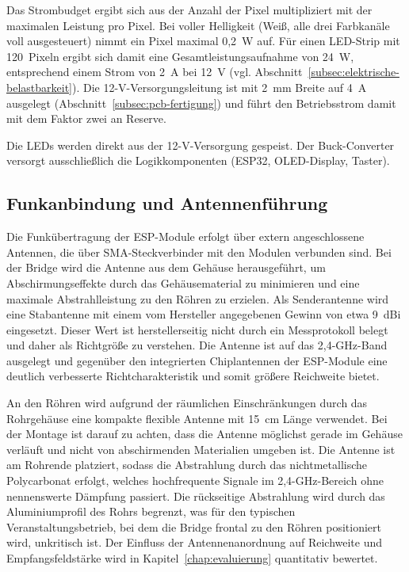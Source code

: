 Das Strombudget ergibt sich aus der Anzahl der Pixel
multipliziert mit der maximalen Leistung pro Pixel. Bei voller
Helligkeit (Weiß, alle drei Farbkanäle voll ausgesteuert)
nimmt ein Pixel maximal 0,2~W auf. Für einen
LED-Strip mit 120~Pixeln ergibt sich damit eine
Gesamtleistungsaufnahme von 24~W, entsprechend einem Strom
von 2~A bei 12~V (vgl. Abschnitt~\ref{subsec:elektrische-belastbarkeit}).
Die 12-V-Versorgungsleitung ist mit 2~mm Breite auf 4~A ausgelegt
(Abschnitt~\ref{subsec:pcb-fertigung}) und führt den Betriebsstrom damit
mit dem Faktor zwei an Reserve.

Die LEDs werden direkt aus der 12-V-Versorgung gespeist. Der
Buck-Converter versorgt ausschließlich die Logikkomponenten
(ESP32, OLED-Display, Taster).

\subsection{Funkanbindung und Antennenführung}
\label{subsec:funk-antenne}

Die Funkübertragung der ESP-Module erfolgt über extern
angeschlossene Antennen, die über SMA-Steckverbinder mit den
Modulen verbunden sind. Bei der Bridge wird die Antenne aus
dem Gehäuse herausgeführt, um Abschirmungseffekte durch das
Gehäusematerial zu minimieren und eine maximale
Abstrahlleistung zu den Röhren zu erzielen. Als
Senderantenne wird eine Stabantenne mit einem vom Hersteller
angegebenen Gewinn von etwa 9~dBi eingesetzt. Dieser Wert ist
herstellerseitig nicht durch ein Messprotokoll belegt und daher als
Richtgröße zu verstehen. Die Antenne ist auf das
2,4-GHz-Band ausgelegt und
gegenüber den integrierten Chiplantennen der ESP-Module eine
deutlich verbesserte Richtcharakteristik und somit größere
Reichweite bietet.

An den Röhren wird aufgrund der räumlichen Einschränkungen
durch das Rohrgehäuse eine kompakte flexible Antenne mit
15~cm Länge verwendet. Bei der Montage ist darauf zu achten,
dass die Antenne möglichst gerade im Gehäuse verläuft und
nicht von abschirmenden Materialien umgeben ist. Die Antenne
ist am Rohrende platziert, sodass die Abstrahlung durch das
nichtmetallische Polycarbonat erfolgt, welches hochfrequente
Signale im 2,4-GHz-Bereich ohne nennenswerte Dämpfung
passiert. Die rückseitige Abstrahlung wird durch das
Aluminiumprofil des Rohrs begrenzt, was für den typischen
Veranstaltungsbetrieb, bei dem die Bridge frontal zu den
Röhren positioniert wird, unkritisch ist. Der Einfluss der
Antennenanordnung auf Reichweite und Empfangsfeldstärke wird
in Kapitel~\ref{chap:evaluierung} quantitativ bewertet.

